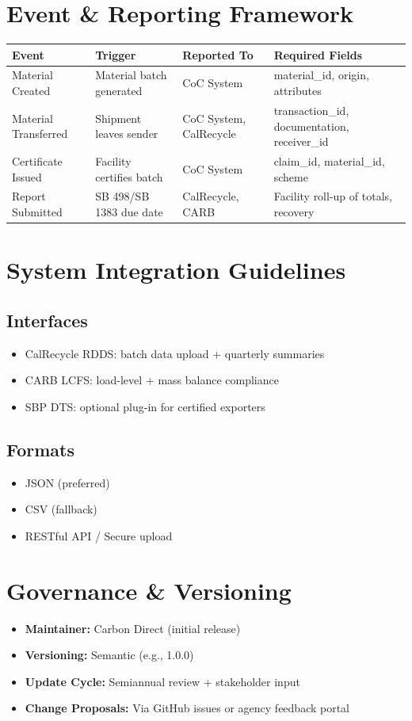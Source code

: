 \documentclass{article}
\begin{document}
\section{Event \& Reporting Framework}
\begin{longtable}{|p{4cm}|p{4cm}|p{4cm}|p{4cm}|}
\hline
\textbf{Event} & \textbf{Trigger} & \textbf{Reported To} & \textbf{Required Fields} \\
\hline
Material Created & Material batch generated & CoC System & material\_id, origin, attributes \\
Material Transferred & Shipment leaves sender & CoC System, CalRecycle & transaction\_id, documentation, receiver\_id \\
Certificate Issued & Facility certifies batch & CoC System & claim\_id, material\_id, scheme \\
Report Submitted & SB 498/SB 1383 due date & CalRecycle, CARB & Facility roll-up of totals, recovery \\
\hline
\end{longtable}

\section{System Integration Guidelines}
\subsection*{Interfaces}
\begin{itemize}[noitemsep]
    \item CalRecycle RDDS: batch data upload + quarterly summaries
    \item CARB LCFS: load-level + mass balance compliance
    \item SBP DTS: optional plug-in for certified exporters
\end{itemize}

\subsection*{Formats}
\begin{itemize}[noitemsep]
    \item JSON (preferred)
    \item CSV (fallback)
    \item RESTful API / Secure upload
\end{itemize}

\section{Governance \& Versioning}
\begin{itemize}[noitemsep]
    \item \textbf{Maintainer:} Carbon Direct (initial release)
    \item \textbf{Versioning:} Semantic (e.g., 1.0.0)
    \item \textbf{Update Cycle:} Semiannual review + stakeholder input
    \item \textbf{Change Proposals:} Via GitHub issues or agency feedback portal
\end{itemize}
\end{document}
